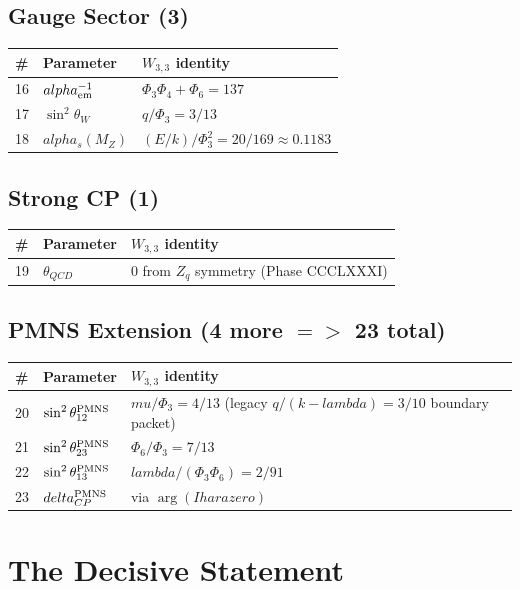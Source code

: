 \documentclass[12pt,a4paper]{article}
\def\mathbb#1{#1}%
\def\text#1{#1}%
\def\alpha{alpha}%
\def\delta{delta}%
\def\lambda{lambda}%
\def\mu{mu}%
\def\Phi#1{Phi#1}%
\def\Rightarrow{ => }%
\theoremstyle{definition}
\newcommand{\ZZ}{\mathbb{Z}}
\begin{document}
\subsection*{Gauge Sector (3)}
\begin{center}
\begin{tabular}{lll}
\toprule
\# & Parameter & $W_{3,3}$ identity \\
\midrule
16 & $\alpha_{\rm em}^{-1}$ & $\Phi_3\Phi_4+\Phi_6=137$ \\
17 & $\sin^2\theta_W$ & $q/\Phi_3=3/13$ \\
18 & $\alpha_s(M_Z)$ & $(E/k)/\Phi_3^2=20/169\approx 0.1183$ \\
\bottomrule
\end{tabular}
\end{center}

\subsection*{Strong CP (1)}
\begin{center}
\begin{tabular}{lll}
\toprule
\# & Parameter & $W_{3,3}$ identity \\
\midrule
19 & $\theta_{QCD}$ & $0$ from $\ZZ_q$ symmetry (Phase CCCLXXXI) \\
\bottomrule
\end{tabular}
\end{center}

\subsection*{PMNS Extension (4 more $\Rightarrow$ 23 total)}
\begin{center}
\begin{tabular}{lll}
\toprule
\# & Parameter & $W_{3,3}$ identity \\
\midrule
20 & $\sin^2\theta_{12}^{\rm PMNS}$ & $\mu/\Phi_3=4/13$ (legacy $q/(k-\lambda)=3/10$ boundary packet) \\
21 & $\sin^2\theta_{23}^{\rm PMNS}$ & $\Phi_6/\Phi_3=7/13$ \\
22 & $\sin^2\theta_{13}^{\rm PMNS}$ & $\lambda/(\Phi_3\Phi_6)=2/91$ \\
23 & $\delta_{CP}^{\rm PMNS}$ & via $\arg(\text{Ihara zero})$ \\
\bottomrule
\end{tabular}
\end{center}

\section*{The Decisive Statement}
\end{document}
